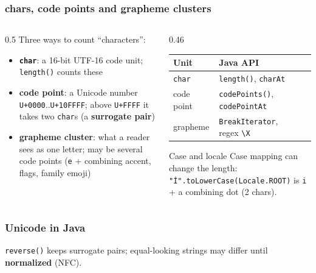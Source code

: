 \documentclass[aspectratio=169,10pt,compress]{beamer}
\begin{document}
\begin{frame}[t,fragile] \frametitle{chars, code points and grapheme clusters}
  \begin{columns}[T]
    \begin{column}{0.5\textwidth}
      \small Three ways to count ``characters'':
      \begin{itemize}\small
        \item \textbf{\texttt{char}}: a 16-bit UTF-16 code unit; \texttt{length()} counts these
        \item \textbf{code point}: a Unicode number \texttt{U+0000}..\texttt{U+10FFFF};
              above \texttt{U+FFFF} it takes two \texttt{char}s (a \textbf{surrogate pair})
        \item \textbf{grapheme cluster}: what a reader sees as one letter; may be several code points
              (\texttt{e} + combining accent, flags, family emoji)
      \end{itemize}
    \end{column}
    \begin{column}{0.46\textwidth}
      \small
      \begin{tabular}{@{}lll@{}}
        \toprule
        \textbf{Unit} & \textbf{Java API} \\
        \midrule
        \texttt{char}       & \texttt{length()}, \texttt{charAt} \\
        code point          & \texttt{codePoints()}, \texttt{codePointAt} \\
        grapheme            & \texttt{BreakIterator}, regex \texttt{\textbackslash X} \\
        \bottomrule
      \end{tabular}

      \vspace{0.5em}
      \begin{alertblock}{Case and locale}
        \small Case mapping can change the length: \texttt{"İ".toLowerCase(Locale.ROOT)} is \texttt{i} + a combining dot (2 chars).
      \end{alertblock}
    \end{column}
  \end{columns}
\end{frame}




\begin{frame}[t,fragile] \frametitle{Unicode in Java}

  \vspace{0.2em}
  \small \texttt{reverse()} keeps surrogate pairs; equal-looking strings may differ until \textbf{normalized} (NFC).
\end{frame}
\end{document}
